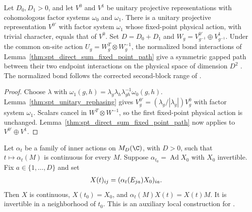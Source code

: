 \begin{lemma}
    \label{thm:spt_cohomologous_fixed_point_path}
    \leanok
    Let $D_0,D_1>0$, and let $V^0$ and $V^1$ be unitary projective
    representations with cohomologous factor systems $\omega_0$ and
    $\omega_1$. There is a unitary projective representation $V^{0\prime}$
    with factor system $\omega_1$ whose fixed-point physical action, with
    trivial character, equals that of $V^0$.
    Set $D=D_0+D_1$ and $W_g=V^{0\prime}_{g^{-1}}\oplus V^1_{g^{-1}}$.
    Under the common on-site action $U_g=W_g^T\otimes W_g^{-1}$, the
    normalized bond interactions of Lemma~\ref{thm:spt_direct_sum_fixed_point_path}
    give a symmetric gapped path between their two endpoint interactions on
    the physical space of dimension $D^2$
    \cite[Section~II.F.2]{Schuch2011Phases}. The normalized bond follows
    the corrected second-block range of
    \cite{gap:spc11_spt_interpolation_upper_range}.
\end{lemma}

\begin{proof}\leanok
    Choose $\lambda$ with
    $\omega_1(g,h)=\lambda_g\lambda_h\lambda_{gh}^{-1}\omega_0(g,h)$.
    Lemma~\ref{thm:spt_unitary_rephasing} gives
    $V^{0\prime}_g=(\lambda_g/|\lambda_g|)V^0_g$ with factor system
    $\omega_1$. Scalars cancel in $W^T\otimes W^{-1}$, so the first
    fixed-point physical action is unchanged.
    Lemma~\ref{thm:spt_direct_sum_fixed_point_path} now applies to
    $V^{0\prime}\oplus V^1$.
\end{proof}

\begin{lemma}
    \label{thm:spt_local_matrix_conjugator}
    \leanok
    Let $\alpha_t$ be a family of inner actions on $M_D(\C)$,
    with $D>0$, such that $t\mapsto\alpha_t(M)$ is continuous
    for every $M$. Suppose $\alpha_{t_0}=\operatorname{Ad}X_0$
    with $X_0$ invertible. Fix $a\in\{1,\ldots,D\}$ and set
    \begin{align}
        X(t)_{ij}=(\alpha_t(E_{ja})X_0)_{ia}.
        \notag
    \end{align}
    Then $X$ is continuous, $X(t_0)=X_0$, and
    $\alpha_t(M)X(t)=X(t)M$. It is invertible in a neighborhood
    of $t_0$. This is an auxiliary local construction for
    \cite[Section~II.F.2]{Schuch2011Phases}.
\end{lemma}

